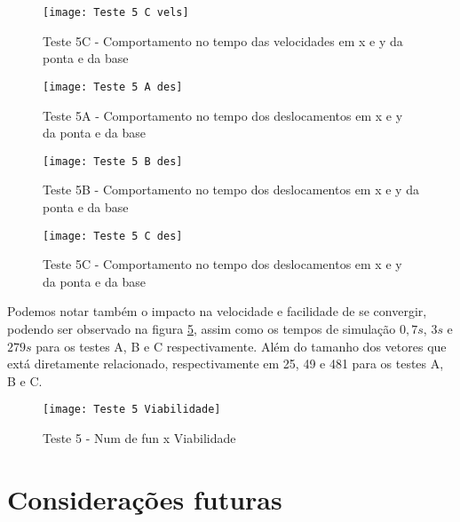 \begin{figure}[!htb]
    \begin{center}
    \caption{Teste 5C - Comportamento no tempo das velocidades em x e y da ponta e da base}
    \texttt{[image: Teste 5 C vels]}
    \label{fig:t_5c_vels}
    \end{center}
\end{figure}

\begin{figure}[!htb]
    \begin{center}
    \caption{Teste 5A - Comportamento no tempo dos deslocamentos em x e y da ponta e da base}
    \texttt{[image: Teste 5 A des]}
    \label{fig:t_5a_des}
    \end{center}
\end{figure}

\begin{figure}[!htb]
    \begin{center}
    \caption{Teste 5B - Comportamento no tempo dos deslocamentos em x e y da ponta e da base}
    \texttt{[image: Teste 5 B des]}
    \label{fig:t_5b_des}
    \end{center}
\end{figure}

\begin{figure}[!htb]
    \begin{center}
    \caption{Teste 5C - Comportamento no tempo dos deslocamentos em x e y da ponta e da base}
    \texttt{[image: Teste 5 C des]}
    \label{fig:t_5c_des}
    \end{center}
\end{figure}

Podemos notar também o impacto na velocidade e facilidade de se convergir, podendo ser observado na figura \ref{fig:t_5_viab}, assim
como os tempos de simulação $0,7 s$, $3 s$ e $279 s$ para os testes A, B e C respectivamente. Além do tamanho dos vetores que extá diretamente relacionado,
respectivamente em 25, 49 e 481 para os testes A, B e C.

\begin{figure}[!htb]
    \begin{center}
    \caption{Teste 5 - Num de fun x Viabilidade}
    \texttt{[image: Teste 5 Viabilidade]}
    \label{fig:t_5_viab}
    \end{center}
\end{figure}

\section{Considerações futuras}
